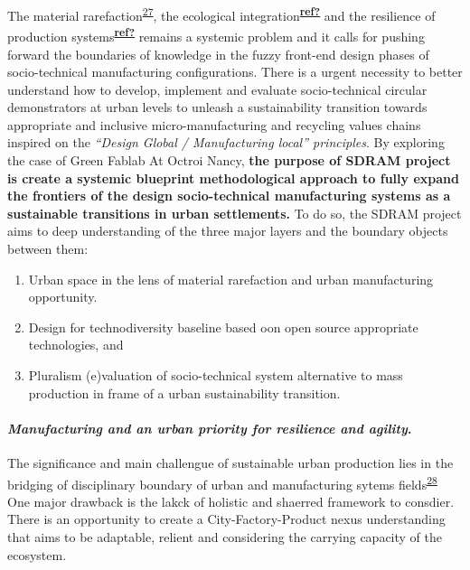 \documentclass[
  11pt,
  a4paperpaper,
  onecolumn]{article}
\let\oldparagraph\paragraph
\renewcommand{\paragraph}[1]{\oldparagraph{#1}\mbox{}}
\providecommand{\tightlist}{%
  \setlength{\itemsep}{0pt}\setlength{\parskip}{0pt}}\usepackage{longtable,booktabs,array}
\let\paragraph\oldparagraph
\begin{document}
The material
rarefaction\textsuperscript{\protect\hyperlink{ref-hultman2021}{27}},
the ecological
integration\textsuperscript{\protect\hyperlink{ref-ref}{\textbf{ref?}}}
and the resilience of production
systems\textsuperscript{\protect\hyperlink{ref-ref}{\textbf{ref?}}}
remains a systemic problem and it calls for pushing forward the
boundaries of knowledge in the fuzzy front-end design phases of
socio-technical manufacturing configurations. There is a urgent
necessity to better understand how to develop, implement and evaluate
socio-technical circular demonstrators at urban levels to unleash a
sustainability transition towards appropriate and inclusive
micro-manufacturing and recycling values chains inspired on the
\emph{``Design Global / Manufacturing local'' principles}. By exploring
the case of Green Fablab At Octroi Nancy, \textbf{the purpose of SDRAM
project is create a systemic blueprint methodological approach to fully
expand the frontiers of the design socio-technical manufacturing systems
as a sustainable transitions in urban settlements.} To do so, the SDRAM
project aims to deep understanding of the three major layers and the
boundary objects between them:

\begin{enumerate}
\def\labelenumi{\arabic{enumi}.}
\tightlist
\item
  Urban space in the lens of material rarefaction and urban
  manufacturing opportunity.
\item
  Design for technodiversity baseline based oon open source appropriate
  technologies, and
\item
  Pluralism (e)valuation of socio-technical system alternative to mass
  production in frame of a urban sustainability transition.
\end{enumerate}

\hypertarget{manufacturing-and-an-urban-priority-for-resilience-and-agility.}{%
\paragraph{\texorpdfstring{\emph{Manufacturing and an urban priority for
resilience and
agility}.}{Manufacturing and an urban priority for resilience and agility.}}\label{manufacturing-and-an-urban-priority-for-resilience-and-agility.}}

The significance and main challengue of sustainable urban production
lies in the bridging of disciplinary boundary of urban and manufacturing
sytems fields\textsuperscript{\protect\hyperlink{ref-Tsui2020}{28}} One
major drawback is the lakck of holistic and shaerred framework to
consdier. There is an opportunity to create a City-Factory-Product nexus
understanding that aims to be adaptable, relient and considering the
carrying capacity of the ecosystem.
\end{document}
